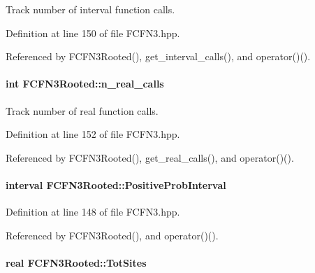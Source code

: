 \-Track number of interval function calls. 



\-Definition at line 150 of file \-F\-C\-F\-N3.\-hpp.



\-Referenced by \-F\-C\-F\-N3\-Rooted(), get\-\_\-interval\-\_\-calls(), and operator()().

\hypertarget{classFCFN3Rooted_a27353da51f2f301e3fc59578f0ce1dbb}{
\paragraph[{n\-\_\-real\-\_\-calls}]{\setlength{\rightskip}{0pt plus 5cm}int {\bf \-F\-C\-F\-N3\-Rooted\-::n\-\_\-real\-\_\-calls}}}\label{classFCFN3Rooted_a27353da51f2f301e3fc59578f0ce1dbb}


\-Track number of real function calls. 



\-Definition at line 152 of file \-F\-C\-F\-N3.\-hpp.



\-Referenced by \-F\-C\-F\-N3\-Rooted(), get\-\_\-real\-\_\-calls(), and operator()().

\hypertarget{classFCFN3Rooted_a94e06be93e45993db4f67855642b6d0a}{
\paragraph[{\-Positive\-Prob\-Interval}]{\setlength{\rightskip}{0pt plus 5cm}interval {\bf \-F\-C\-F\-N3\-Rooted\-::\-Positive\-Prob\-Interval}}}\label{classFCFN3Rooted_a94e06be93e45993db4f67855642b6d0a}


\-Definition at line 148 of file \-F\-C\-F\-N3.\-hpp.



\-Referenced by \-F\-C\-F\-N3\-Rooted(), and operator()().

\hypertarget{classFCFN3Rooted_ac071065bf14d9a7db421bff6e0d05db7}{
\paragraph[{\-Tot\-Sites}]{\setlength{\rightskip}{0pt plus 5cm}real {\bf \-F\-C\-F\-N3\-Rooted\-::\-Tot\-Sites}}}\label{classFCFN3Rooted_ac071065bf14d9a7db421bff6e0d05db7}


